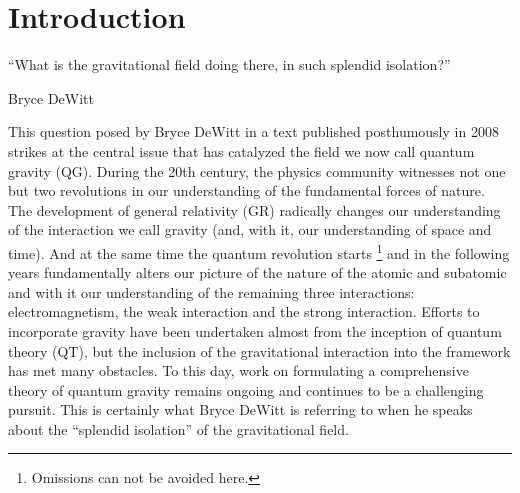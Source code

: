 \chapter{Introduction} \label{ch:intro}

\epigraph{``What is the  gravitational field doing there, in such splendid isolation?''}{Bryce DeWitt}
\vspace{-0.5\baselineskip}

\bartriangledivide

\vspace{0.2\baselineskip}


This question posed by Bryce DeWitt in a text published posthumously in 2008
\cite{dewittQuantumGravityYesterday2009} strikes at the central issue that has
catalyzed the field we now call quantum gravity (QG). During the 20th century,
the physics community witnesses not one but two revolutions in our
understanding of the fundamental forces of nature. The development of general
relativity (GR) \cite{einsteinUberSpezielleUnd1956} radically changes our
understanding of the interaction we call gravity (and, with it, our
understanding of space and time). And at the same time the quantum revolution
starts
\cite{planckUberVerbesserungWienschen1900,planckUeberGesetzEnergieverteilung1901,einsteinUberErzeugungUnd1905,heisenbergUberQuantentheoretischeUmdeutung1925,bornZurQuantenmechanik1925,bornZurQuantenmechanikII1926,schrodingerUndulatoryTheoryMechanics1926}\footnote{Omissions
can not be avoided here.} and in the following years fundamentally alters our
picture of the nature of the atomic and subatomic and with it our understanding
of the remaining three interactions: electromagnetism, the weak interaction and
the strong interaction. Efforts to incorporate gravity have been undertaken
almost from the inception of quantum theory (QT), but the inclusion of the gravitational
interaction into the framework has met many obstacles. To this day, work on
formulating a comprehensive theory of quantum gravity remains ongoing and
continues to be a challenging pursuit. This is certainly what Bryce DeWitt is
referring to when he speaks about the ``splendid isolation'' of the
gravitational field. 

